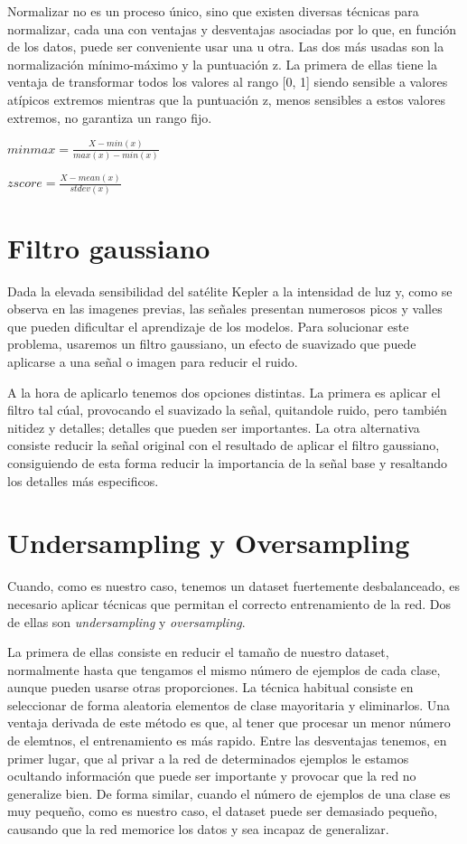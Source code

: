 Normalizar no es un proceso único, sino que existen diversas técnicas para normalizar, cada una con ventajas y desventajas asociadas por lo que, en función de los datos, puede ser conveniente usar una u otra. Las dos más usadas son la normalización mínimo-máximo y la puntuación z. La primera de ellas tiene la ventaja de transformar todos los valores al rango [0, 1] siendo sensible a valores atípicos extremos mientras que la puntuación z, menos sensibles a estos valores extremos, no garantiza un rango fijo.

\begin{math}
	minmax = \frac{X - min(x)}{max(x) - min(x)}
\end{math}

\begin{math}	
	zscore = \frac{X - mean(x)}{stdev(x)}
\end{math}

\section{Filtro gaussiano}
Dada la elevada sensibilidad del satélite Kepler a la intensidad de luz y, como se observa en las imagenes previas, las señales presentan numerosos picos y valles que pueden dificultar el aprendizaje de los modelos. Para solucionar este problema, usaremos un filtro gaussiano, un efecto de suavizado que puede aplicarse a una señal o imagen para reducir el ruido.

A la hora de aplicarlo tenemos dos opciones distintas. La primera es aplicar el filtro tal cúal, provocando el suavizado la señal, quitandole ruido, pero también nitidez y detalles; detalles que pueden ser importantes. La otra alternativa consiste reducir la señal original con el resultado de aplicar el filtro gaussiano, consiguiendo de esta forma reducir la importancia de la señal base y resaltando los detalles más especificos.

\section{Undersampling y Oversampling}
Cuando, como es nuestro caso, tenemos un dataset fuertemente desbalanceado, es necesario aplicar técnicas que permitan el correcto entrenamiento de la red. Dos de ellas son \textit{undersampling} y \textit{oversampling}.

La primera de ellas consiste en reducir el tamaño de nuestro dataset, normalmente hasta que tengamos el mismo número de ejemplos de cada clase, aunque pueden usarse otras proporciones. La técnica habitual consiste en seleccionar de forma aleatoria elementos de clase mayoritaria y eliminarlos. Una ventaja derivada de este método es que, al tener que procesar un menor número de elemtnos, el entrenamiento es más rapido. Entre las desventajas tenemos, en primer lugar, que al privar a la red de determinados ejemplos le estamos ocultando información que puede ser importante y provocar que la red no generalize bien. De forma similar, cuando el número de ejemplos de una clase es muy pequeño, como es nuestro caso, el dataset puede ser demasiado pequeño, causando que la red memorice los datos y sea incapaz de generalizar.

